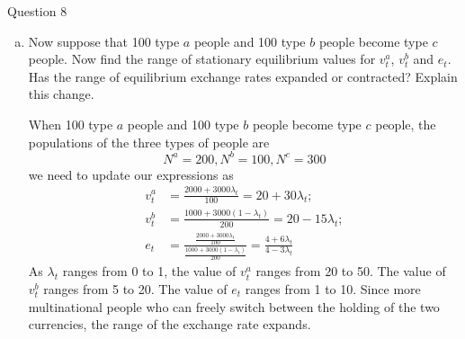 \documentclass[a4paper]{article}
\newif\IfInSansMode
\numberwithin{equation}{section}
\numberwithin{figure}{section}
\begin{document}
\begin{questionbox}{Question 8}
\begin{enumerate}[(a)]
\begin{explanationbox}
			\end{explanationbox}
			\item Now suppose that 100 type \( a \) people and 100 type \( b \) people become type \( c \) people. Now find the range of stationary equilibrium values for \( v_t^a \), \( v_t^b \) and \( e_t \). Has the range of equilibrium exchange rates expanded or contracted? Explain this change.
			\begin{explanationbox}
				When 100 type \( a \) people and 100 type \( b \) people become type \( c \) people, the populations of the three types of people are
				\[
					N^a = 200, N^b = 100, N^c = 300
				\]
				we need to update our expressions as
				\begin{align*}
					v_t^a &= \frac{2000+3000\lambda_t}{100} = 20 + 30\lambda_t;\\
					v_t^b &= \frac{1000+3000(1-\lambda_t)}{200} = 20 - 15\lambda_t;\\
					e_t &= \frac{\frac{2000+3000\lambda_t}{100}}{\frac{1000+3000(1-\lambda_t)}{200}} = \frac{4+6\lambda_t}{4-3\lambda_t}
				\end{align*}
				As \( \lambda_t \) ranges from 0 to 1, the value of \( v_t^a \) ranges from 20 to 50. The value of \( v_t^b \) ranges from 5 to 20. The value of \( e_t \) ranges from 1 to 10. Since more multinational people who can freely switch between the holding of the two currencies, the range of the exchange rate expands.
			\end{explanationbox}
		\end{enumerate}
	\end{questionbox}
\end{document}
